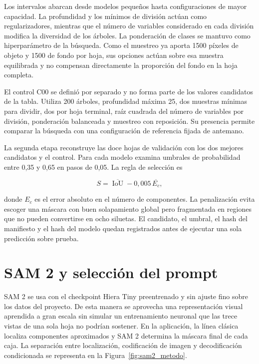 Los intervalos abarcan desde modelos pequeños hasta configuraciones de mayor capacidad. La profundidad y los mínimos de división actúan como regularizadores, mientras que el número de variables considerado en cada división modifica la diversidad de los árboles. La ponderación de clases se mantuvo como hiperparámetro de la búsqueda. Como el muestreo ya aporta 1500 píxeles de objeto y 1500 de fondo por hoja, sus opciones actúan sobre esa muestra equilibrada y no compensan directamente la proporción del fondo en la hoja completa.

El control C00 se definió por separado y no forma parte de los valores candidatos de la tabla. Utiliza 200 árboles, profundidad máxima 25, dos muestras mínimas para dividir, dos por hoja terminal, raíz cuadrada del número de variables por división, ponderación balanceada y muestreo con reposición. Su presencia permite comparar la búsqueda con una configuración de referencia fijada de antemano.

La segunda etapa reconstruye las doce hojas de validación con los dos mejores candidatos y el control. Para cada modelo examina umbrales de probabilidad entre 0,35 y 0,65 en pasos de 0,05. La regla de selección es

\begin{equation}
S = \overline{\operatorname{IoU}} - 0{,}005\,\overline{E_c},
\label{eq:seleccion_rf}
\end{equation}

donde $E_c$ es el error absoluto en el número de componentes. La penalización evita escoger una máscara con buen solapamiento global pero fragmentada en regiones que no pueden convertirse en ocho siluetas. El candidato, el umbral, el hash del manifiesto y el hash del modelo quedan registrados antes de ejecutar una sola predicción sobre prueba.

\section{SAM 2 y selección del prompt}

SAM 2 se usa con el checkpoint Hiera Tiny preentrenado y sin ajuste fino sobre los datos del proyecto. De esta manera se aprovecha una representación visual aprendida a gran escala sin simular un entrenamiento neuronal que las trece vistas de una sola hoja no podrían sostener. En la aplicación, la línea clásica localiza componentes aproximados y SAM 2 determina la máscara final de cada caja. La separación entre localización, codificación de imagen y decodificación condicionada se representa en la Figura~\ref{fig:sam2_metodo}.

